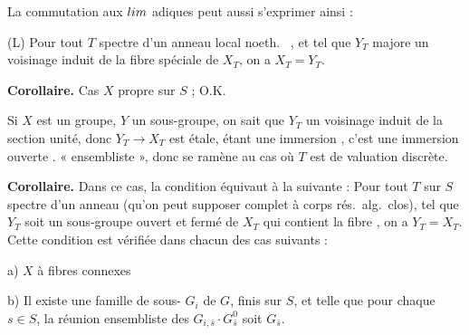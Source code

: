\documentclass[11pt,a4paper]{article}
\begin{document}

    


La commutation aux $\varprojlim$ adiques peut aussi s'exprimer ainsi :

(L) Pour tout $T$  spectre d'un anneau local noeth.\  , et tel que $Y_T$ majore un voisinage  induit de la fibre spéciale de $X_T$, on a  $X_T=Y_T$.

\textbf{Corollaire.} Cas $X$ propre sur $S$ ; O.K.

Si $X$ est un groupe, $Y$ un sous-groupe, on sait que $Y_T$   un voisinage  induit de la section unité, donc $Y_T\to X_T$ est  étale, \struck{\ill{}} étant une immersion , c'est une immersion ouverte .   \struck{\ill{}}  « ensembliste », donc se ramène au cas où $T$ est  de valuation discrète. 

\textbf{Corollaire.} Dans ce cas, la condition  équivaut à la suivante : Pour tout $T$ sur $S$ spectre d'un anneau   (qu'on peut supposer complet à corps rés.\ alg.\ clos), tel que $Y_T$ soit un sous-groupe ouvert et fermé de $X_T$ qui contient la fibre  , on a $Y_T=X_T$. Cette condition est vérifiée dans chacun des cas suivants :

a) $X$ à fibres connexes

b) Il existe une famille de sous-  $G_i$ de $G$, finis sur $S$, et telle que pour chaque $s\in S$, la réunion ensembliste des $G_{i,\bar s}\cdot G^0_{\bar s}$ soit $G_{\bar s}$.


    \struck{\ill{}}
\end{document}
